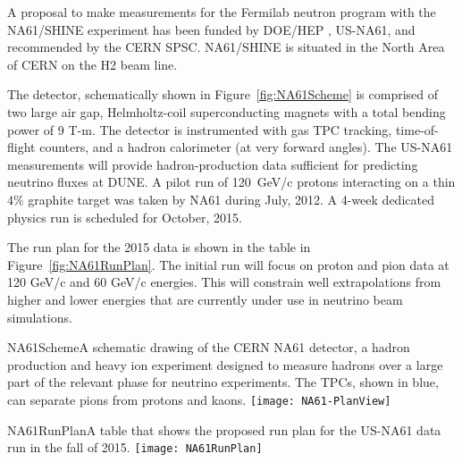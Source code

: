 A proposal to make measurements for the Fermilab neutron program with the NA61/SHINE experiment has been funded by DOE/HEP \cite{ref:NA61Proposal,ref:NA61Addendum} , US-NA61, and recommended by the CERN SPSC. NA61/SHINE is situated in the North Area of CERN on the H2 beam line. 

The detector, schematically shown in Figure~\ref{fig:NA61Scheme} is comprised of two large air gap, Helmholtz-coil superconducting magnets with a total bending power of 9 T-m. The detector is instrumented with gas TPC tracking, time-of-flight counters, and a hadron calorimeter (at very forward angles). The US-NA61 measurements will provide hadron-production data sufficient for predicting neutrino fluxes at DUNE. A pilot run of 120~GeV/c protons interacting on a thin 4\% graphite target was taken by NA61 during July, 2012. A 4-week dedicated physics run is scheduled for October, 2015.

The run plan for the 2015 data is shown in the table in Figure~\ref{fig:NA61RunPlan}. The initial run will focus on proton and pion data at 120 GeV/c and 60 GeV/c energies. This will constrain well extrapolations from higher and lower energies that are currently under use in neutrino beam simulations.

\begin{cdrfigure}{NA61Scheme}{A schematic drawing of the CERN NA61 detector, a hadron production and heavy ion experiment designed to measure hadrons over a large part of the relevant phase for neutrino experiments. The TPCs, shown in blue, can separate pions from protons and kaons.}
\texttt{[image: NA61-PlanView]}
\end{cdrfigure}

\begin{cdrfigure}{NA61RunPlan}{A table that shows the proposed run plan for 
the US-NA61 data run in the fall of 2015.}
\texttt{[image: NA61RunPlan]}
\end{cdrfigure}

